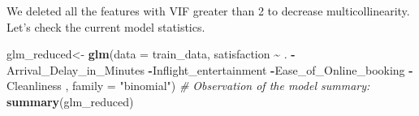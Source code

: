 \documentclass[
]{article}
\newenvironment{Shaded}{\begin{snugshade}}{\end{snugshade}}
\newcommand{\AttributeTok}[1]{\textcolor[rgb]{0.13,0.29,0.53}{#1}}
\newcommand{\CommentTok}[1]{\textcolor[rgb]{0.56,0.35,0.01}{\textit{#1}}}
\newcommand{\FunctionTok}[1]{\textcolor[rgb]{0.13,0.29,0.53}{\textbf{#1}}}
\newcommand{\NormalTok}[1]{#1}
\newcommand{\OtherTok}[1]{\textcolor[rgb]{0.56,0.35,0.01}{#1}}
\newcommand{\SpecialCharTok}[1]{\textcolor[rgb]{0.81,0.36,0.00}{\textbf{#1}}}
\newcommand{\StringTok}[1]{\textcolor[rgb]{0.31,0.60,0.02}{#1}}
\begin{document}
We deleted all the features with VIF greater than 2 to decrease
multicollinearity. Let's check the current model statistics.

\begin{Shaded}
\begin{Highlighting}[]
\NormalTok{glm\_reduced}\OtherTok{\textless{}{-}} \FunctionTok{glm}\NormalTok{(}\AttributeTok{data =}\NormalTok{ train\_data,}
\NormalTok{                satisfaction }\SpecialCharTok{\textasciitilde{}}\NormalTok{ .}
                \SpecialCharTok{{-}}\NormalTok{Arrival\_Delay\_in\_Minutes}
                \SpecialCharTok{{-}}\NormalTok{Inflight\_entertainment}
                \SpecialCharTok{{-}}\NormalTok{Ease\_of\_Online\_booking }
                \SpecialCharTok{{-}}\NormalTok{Cleanliness    ,}
                \AttributeTok{family =} \StringTok{"binomial"}\NormalTok{)}
\CommentTok{\# Observation of the model summary:}
\FunctionTok{summary}\NormalTok{(glm\_reduced)}
\end{Highlighting}
\end{Shaded}
\end{document}
